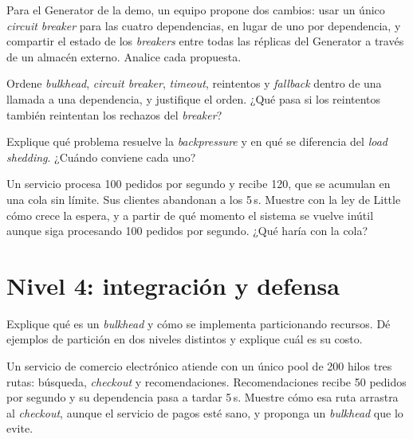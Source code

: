 \documentclass[variant=guia,cover=institutional,mode=screen]{ua-engineering-v6-article}
\begin{document}
\begin{uaexercise}
Para el Generator de la demo, un equipo propone dos cambios: usar un único \emph{circuit breaker} para las cuatro dependencias, en lugar de uno por dependencia, y compartir el estado de los \emph{breakers} entre todas las réplicas del Generator a través de un almacén externo. Analice cada propuesta.
\end{uaexercise}

\begin{uaexercise}
Ordene \emph{bulkhead}, \emph{circuit breaker}, \emph{timeout}, reintentos y \emph{fallback} dentro de una llamada a una dependencia, y justifique el orden. ¿Qué pasa si los reintentos también reintentan los rechazos del \emph{breaker}?
\end{uaexercise}

\begin{uaexercise}
Explique qué problema resuelve la \emph{backpressure} y en qué se diferencia del \emph{load shedding}. ¿Cuándo conviene cada uno?
\end{uaexercise}

\begin{uaexercise}
Un servicio procesa 100 pedidos por segundo y recibe 120, que se acumulan en una cola sin límite. Sus clientes abandonan a los 5\,s. Muestre con la ley de Little cómo crece la espera, y a partir de qué momento el sistema se vuelve inútil aunque siga procesando 100 pedidos por segundo. ¿Qué haría con la cola?
\end{uaexercise}


\section{Nivel 4: integración y defensa}
\begin{uaexercise}
Explique qué es un \emph{bulkhead} y cómo se implementa particionando recursos. Dé ejemplos de partición en dos niveles distintos y explique cuál es su costo.
\end{uaexercise}

\begin{uaexercise}
Un servicio de comercio electrónico atiende con un único pool de 200 hilos tres rutas: búsqueda, \emph{checkout} y recomendaciones. Recomendaciones recibe 50 pedidos por segundo y su dependencia pasa a tardar 5\,s. Muestre cómo esa ruta arrastra al \emph{checkout}, aunque el servicio de pagos esté sano, y proponga un \emph{bulkhead} que lo evite.
\end{uaexercise}
\end{document}

